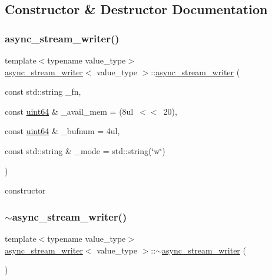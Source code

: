 \subsection{Constructor \& Destructor Documentation}
\mbox{\label{classasync__stream__writer_a11b5cdf01df7a627d00c6e77be165702}} 
\subsubsection{\texorpdfstring{async\+\_\+stream\+\_\+writer()}{async\_stream\_writer()}}
{\footnotesize\ttfamily template$<$typename value\+\_\+type$>$ \\
\hyperlink{classasync__stream__writer}{async\+\_\+stream\+\_\+writer}$<$ value\+\_\+type $>$\+::\hyperlink{classasync__stream__writer}{async\+\_\+stream\+\_\+writer} (\begin{DoxyParamCaption}\item[{const std\+::string}]{\+\_\+fn,  }\item[{const \hyperlink{types_8h_a60e8696a4678cd348e991a1f172e53f7}{uint64} \&}]{\+\_\+avail\+\_\+mem = {\ttfamily (8ul~$<$$<$~20)},  }\item[{const \hyperlink{types_8h_a60e8696a4678cd348e991a1f172e53f7}{uint64} \&}]{\+\_\+bufnum = {\ttfamily 4ul},  }\item[{const std\+::string \&}]{\+\_\+mode = {\ttfamily std\+:\+:string(\char`\"{}w\char`\"{})} }\end{DoxyParamCaption})\hspace{0.3cm}{\ttfamily [inline]}}



constructor 

\mbox{\label{classasync__stream__writer_ac001ff454b249e4f71b4f92755017334}} 
\subsubsection{\texorpdfstring{$\sim$async\+\_\+stream\+\_\+writer()}{~async\_stream\_writer()}}
{\footnotesize\ttfamily template$<$typename value\+\_\+type$>$ \\
\hyperlink{classasync__stream__writer}{async\+\_\+stream\+\_\+writer}$<$ value\+\_\+type $>$\+::$\sim$\hyperlink{classasync__stream__writer}{async\+\_\+stream\+\_\+writer} (\begin{DoxyParamCaption}{ }\end{DoxyParamCaption})\hspace{0.3cm}{\ttfamily [inline]}}



